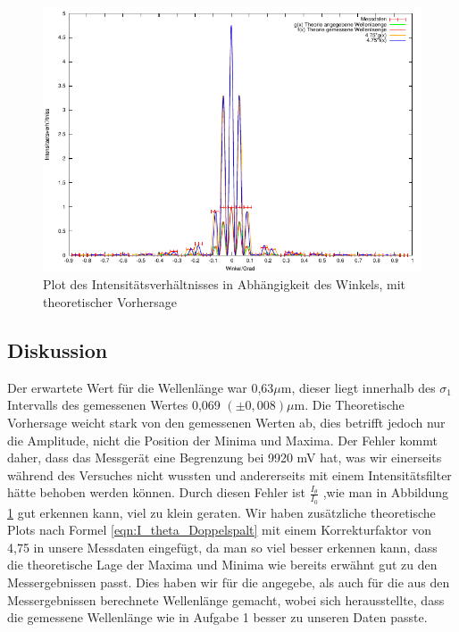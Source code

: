 \documentclass[12pt]{scrartcl}
\begin{document}
\begin{figure}[H]
\centering
    \includegraphics[scale = 1]{a_3.pdf}
  	\caption[Plot des Intensitätsverhältnisses in Abhängigkeit des Winkels, mit theoretischer Vorhersage]{Plot des Intensitätsverhältnisses in Abhängigkeit des Winkels, mit theoretischer Vorhersage}
  \label{fig:a_3}
\end{figure}


\subsection{Diskussion}
Der erwartete Wert für die Wellenlänge war 0,63$\mu$m, dieser liegt innerhalb des $\sigma_1$ Intervalls des gemessenen Wertes 0,069 $(\pm 0,008) \mu$m. Die Theoretische Vorhersage weicht stark von den gemessenen Werten ab, dies betrifft jedoch nur die Amplitude, nicht die Position der Minima und Maxima. Der Fehler kommt daher, dass das Messgerät eine Begrenzung bei 9920 mV hat, was wir einerseits während des Versuches nicht wussten und andererseits mit einem Intensitätsfilter hätte behoben werden können. Durch diesen Fehler ist $\frac{I_\theta}{I_0}$ ,wie man in Abbildung \ref{fig:a_3} gut erkennen kann, viel zu klein geraten. Wir haben zusätzliche theoretische Plots nach Formel \ref{eqn:I_theta_Doppelspalt} mit einem Korrekturfaktor von 4,75 in unsere Messdaten eingefügt, da man so viel besser erkennen kann, dass die theoretische Lage der Maxima und Minima wie bereits erwähnt gut zu den Messergebnissen passt. Dies haben wir für die angegebe, als auch für die aus den Messergebnissen berechnete Wellenlänge gemacht, wobei sich herausstellte, dass die gemessene Wellenlänge wie in Aufgabe 1 besser zu unseren Daten passte.
\end{document}
